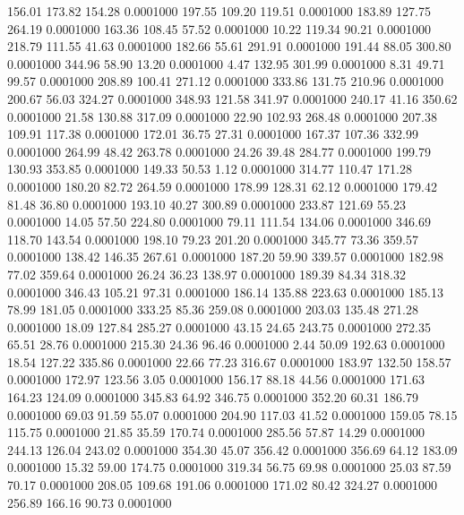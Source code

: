  156.01  173.82  154.28   0.0001000
 197.55  109.20  119.51   0.0001000
 183.89  127.75  264.19   0.0001000
 163.36  108.45   57.52   0.0001000
  10.22  119.34   90.21   0.0001000
 218.79  111.55   41.63   0.0001000
 182.66   55.61  291.91   0.0001000
 191.44   88.05  300.80   0.0001000
 344.96   58.90   13.20   0.0001000
   4.47  132.95  301.99   0.0001000
   8.31   49.71   99.57   0.0001000
 208.89  100.41  271.12   0.0001000
 333.86  131.75  210.96   0.0001000
 200.67   56.03  324.27   0.0001000
 348.93  121.58  341.97   0.0001000
 240.17   41.16  350.62   0.0001000
  21.58  130.88  317.09   0.0001000
  22.90  102.93  268.48   0.0001000
 207.38  109.91  117.38   0.0001000
 172.01   36.75   27.31   0.0001000
 167.37  107.36  332.99   0.0001000
 264.99   48.42  263.78   0.0001000
  24.26   39.48  284.77   0.0001000
 199.79  130.93  353.85   0.0001000
 149.33   50.53    1.12   0.0001000
 314.77  110.47  171.28   0.0001000
 180.20   82.72  264.59   0.0001000
 178.99  128.31   62.12   0.0001000
 179.42   81.48   36.80   0.0001000
 193.10   40.27  300.89   0.0001000
 233.87  121.69   55.23   0.0001000
  14.05   57.50  224.80   0.0001000
  79.11  111.54  134.06   0.0001000
 346.69  118.70  143.54   0.0001000
 198.10   79.23  201.20   0.0001000
 345.77   73.36  359.57   0.0001000
 138.42  146.35  267.61   0.0001000
 187.20   59.90  339.57   0.0001000
 182.98   77.02  359.64   0.0001000
  26.24   36.23  138.97   0.0001000
 189.39   84.34  318.32   0.0001000
 346.43  105.21   97.31   0.0001000
 186.14  135.88  223.63   0.0001000
 185.13   78.99  181.05   0.0001000
 333.25   85.36  259.08   0.0001000
 203.03  135.48  271.28   0.0001000
  18.09  127.84  285.27   0.0001000
  43.15   24.65  243.75   0.0001000
 272.35   65.51   28.76   0.0001000
 215.30   24.36   96.46   0.0001000
   2.44   50.09  192.63   0.0001000
  18.54  127.22  335.86   0.0001000
  22.66   77.23  316.67   0.0001000
 183.97  132.50  158.57   0.0001000
 172.97  123.56    3.05   0.0001000
 156.17   88.18   44.56   0.0001000
 171.63  164.23  124.09   0.0001000
 345.83   64.92  346.75   0.0001000
 352.20   60.31  186.79   0.0001000
  69.03   91.59   55.07   0.0001000
 204.90  117.03   41.52   0.0001000
 159.05   78.15  115.75   0.0001000
  21.85   35.59  170.74   0.0001000
 285.56   57.87   14.29   0.0001000
 244.13  126.04  243.02   0.0001000
 354.30   45.07  356.42   0.0001000
 356.69   64.12  183.09   0.0001000
  15.32   59.00  174.75   0.0001000
 319.34   56.75   69.98   0.0001000
  25.03   87.59   70.17   0.0001000
 208.05  109.68  191.06   0.0001000
 171.02   80.42  324.27   0.0001000
 256.89  166.16   90.73   0.0001000
